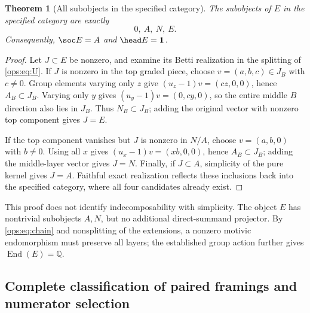 \documentclass[11pt,a4paper,oneside]{article}
\theoremstyle{plain}
\newtheorem{theorem}{Theorem}[section]
\theoremstyle{definition}
\theoremstyle{remark}
\newcommand{\Q}{\mathbb Q}
\newcommand{\End}{\operatorname{End}}
\numberwithin{equation}{section}
\begin{document}
\begin{theorem}[All subobjects in the specified category]\label{ops:thm:uniserial}
The subobjects of $E$ in the specified category are exactly
\begin{equation}\label{ops:eq:chain}
                        0,\ A,\ N,\ E.
\end{equation}
Consequently, $\soc E=A$ and $\head E=\mathbf1$.
\end{theorem}
\begin{proof}
Let $J\subset E$ be nonzero, and examine its Betti realization in the splitting of \eqref{ops:eq:U}.
If $J$ is nonzero in the top graded piece, choose $v=(a,b,c)\in J_B$ with $c\ne0$.
Group elements varying only $z$ give $(u_z-1)v=(cz,0,0)$, hence $A_B\subset J_B$.
Varying only $y$ gives $(u_y-1)v=(0,cy,0)$, so the entire middle $B$ direction also lies in $J_B$.
Thus $N_B\subset J_B$; adding the original vector with nonzero top component gives $J=E$.

If the top component vanishes but $J$ is nonzero in $N/A$, choose $v=(a,b,0)$ with $b\ne0$.
Using all $x$ gives $(u_x-1)v=(xb,0,0)$, hence $A_B\subset J_B$;
adding the middle-layer vector gives $J=N$.
Finally, if $J\subset A$, simplicity of the pure kernel gives $J=A$.
Faithful exact realization reflects these inclusions back into the specified category, where all four candidates already exist.
\end{proof}

This proof does not identify indecomposability with simplicity.
The object $E$ has nontrivial subobjects $A,N$, but no additional direct-summand projector.
By \eqref{ops:eq:chain} and nonsplitting of the extensions, a nonzero motivic endomorphism must preserve all layers;
the established group action further gives $\End(E)=\Q$.


\subsection{Complete classification of paired framings and numerator selection}
\end{document}
